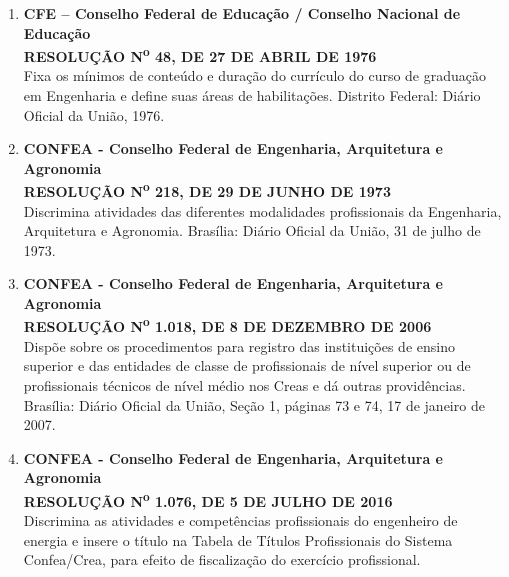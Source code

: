\begin{enumerate}
    \item \textbf{CFE – Conselho Federal de Educação / Conselho Nacional de Educação}  \\
    \textbf{RESOLUÇÃO N\textsuperscript{o} 48, DE 27 DE ABRIL DE 1976}  \\
    Fixa os mínimos de conteúdo e duração do currículo do curso de graduação em Engenharia e define suas áreas de habilitações. Distrito Federal: Diário Oficial da União, 1976.

    \item \textbf{CONFEA - Conselho Federal de Engenharia, Arquitetura e Agronomia}  \\
    \textbf{RESOLUÇÃO N\textsuperscript{o} 218, DE 29 DE JUNHO DE 1973} \\
    Discrimina atividades das diferentes modalidades profissionais da Engenharia, Arquitetura e Agronomia. Brasília: Diário Oficial da União, 31 de julho de 1973.

    \item \textbf{CONFEA - Conselho Federal de Engenharia, Arquitetura e Agronomia}  \\
    \textbf{RESOLUÇÃO N\textsuperscript{o} 1.018, DE 8 DE DEZEMBRO DE 2006}  \\
    Dispõe sobre os procedimentos para registro das instituições de ensino superior e das entidades de classe de profissionais de nível superior ou de profissionais técnicos de nível médio nos Creas e dá outras providências. Brasília: Diário Oficial da União, Seção 1, páginas 73 e 74, 17 de janeiro de 2007.

    \item \textbf{CONFEA - Conselho Federal de Engenharia, Arquitetura e Agronomia}  \\
    \textbf{RESOLUÇÃO N\textsuperscript{o} 1.076, DE 5 DE JULHO DE 2016}  \\
    Discrimina as atividades e competências profissionais do engenheiro de energia e insere o título na Tabela de Títulos Profissionais do Sistema Confea/Crea, para efeito de fiscalização do exercício profissional.
\end{enumerate}

